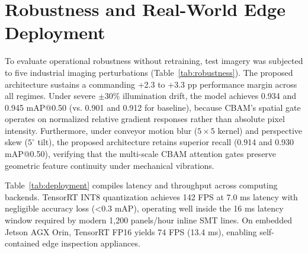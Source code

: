 \documentclass{llncs}
\begin{document}
\section{Robustness and Real-World Edge Deployment}
To evaluate operational robustness without retraining, test imagery was subjected to five industrial imaging perturbations (Table~\ref{tab:robustness}). The proposed architecture sustains a commanding +2.3 to +3.3 pp performance margin across all regimes. Under severe $\pm 30\%$ illumination drift, the model achieves 0.934 and 0.945 mAP@0.50 (vs. 0.901 and 0.912 for baseline), because CBAM's spatial gate operates on normalized relative gradient responses rather than absolute pixel intensity. Furthermore, under conveyor motion blur ($5\times 5$ kernel) and perspective skew ($5^\circ$ tilt), the proposed architecture retains superior recall (0.914 and 0.930 mAP@0.50), verifying that the multi-scale CBAM attention gates preserve geometric feature continuity under mechanical vibrations.

\begin{table}[!htbp]
\centering
\caption{Inference Robustness Evaluation Under Real-World Industrial Image Degradations.}
\label{tab:robustness}
\end{table}

Table~\ref{tab:deployment} compiles latency and throughput across computing backends. TensorRT INT8 quantization achieves 142 FPS at 7.0 ms latency with negligible accuracy loss (<0.3 mAP), operating well inside the 16 ms latency window required by modern 1,200 panels/hour inline SMT lines. On embedded Jetson AGX Orin, TensorRT FP16 yields 74 FPS (13.4 ms), enabling self-contained edge inspection appliances.
\end{document}
